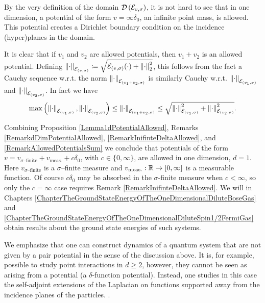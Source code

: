 \begin{remark}\label{RemarkInifinteDeltaAllowed}
	By the very definition of the domain $ \mathcal D\left(\mathcal{E}_{v,\sigma}\right) $, it is not hard to see that in one dimension, a potential of the form $ v=\infty\delta_0 $, \ie an infinite point mass, is allowed. This potential creates a Dirichlet boundary condition on the incidence (hyper)planes in the domain.
\end{remark}
\begin{remark}\label{RemarkAllowedPotentialsSum}
	It is clear that if $ v_1 $ and $ v_2 $ are allowed potentials, then $ v_1+v_2 $ is an allowed potential. Defining $ \left\lVert \cdot \right\rVert_{\mathcal{E}_{(v,\sigma)}}\coloneqq\sqrt{\mathcal{E}_{(v,\sigma)}(\cdot)+\left\lVert \cdot \right\rVert_2^2} $, this follows from the fact a Cauchy sequence w.r.t. the norm $ \left\lVert \cdot \right\rVert_{\mathcal{E}_{(v_1+v_2,\sigma)}} $ is similarly Cauchy w.r.t. $ \left\lVert \cdot \right\rVert_{\mathcal{E}_{(v_{1},\sigma)}} $ and $ \left\lVert \cdot \right\rVert_{\mathcal{E}_{(v_2,\sigma)}} $. In fact we have $$ \max\left(\left\lVert \cdot \right\rVert_{\mathcal{E}_{(v_1,\sigma)}},\left\lVert \cdot \right\rVert_{\mathcal{E}_{(v_2,\sigma)}}\right)\leq \left\lVert \cdot \right\rVert_{\mathcal{E}_{(v_1+v_2,\sigma)}}\leq \sqrt{\left\lVert \cdot \right\rVert_{\mathcal{E}_{(v_1,\sigma)}}^2+\left\lVert \cdot \right\rVert_{\mathcal{E}_{(v_2,\sigma)}}^2}. $$
\end{remark}
\begin{remark}
	Combining Proposition \ref{Lemma1dPotentialAllowed}, Remarks \ref{RemarkdDimPotentialAllowed}, \ref{RemarkInifinteDeltaAllowed}, and \ref{RemarkAllowedPotentialsSum} we conclude that potentials of the form $ v=v_{\sigma\text{--finite}}+v_{\text{meas.}}+c\delta_0 $, with $ c\in\{0,\infty\} $, are allowed in one dimension, $ d=1 $. Here $ v_{\sigma\text{--finite}} $ is a $ \sigma $--finite measure and $ v_{\text{meas.}}:\mathbb{R} \to[0,\infty] $ is a measurable function. Of course $ c\delta_0 $ may be absorbed in the $ \sigma $-finite measure when $ c<\infty $, so only the $ c=\infty $ case requires Remark \ref{RemarkInifinteDeltaAllowed}.
	 We will in Chapters \ref{ChapterTheGroundStateEnergyOfTheOneDimensionalDiluteBoseGas} and \ref{ChapterTheGroundStateEnergyOfTheOneDimensionalDiluteSpin1/2FermiGas} obtain results about the ground state energies of such systems.
\end{remark}
\begin{remark}
	We emphasize that one can construct dynamics of a quantum system that are not given by a pair potential in the sense of the discussion above. It is, for example, possible to study point interactions in $ d\geq 2 $, however, they cannot be seen as arising from a potential (\eg a $ \delta $-function potential). Instead, one studies in this case the self-adjoint extensions of the Laplacian on functions supported away from the incidence planes of the particles. \cite{albeverio2012solvable}.
\end{remark}


